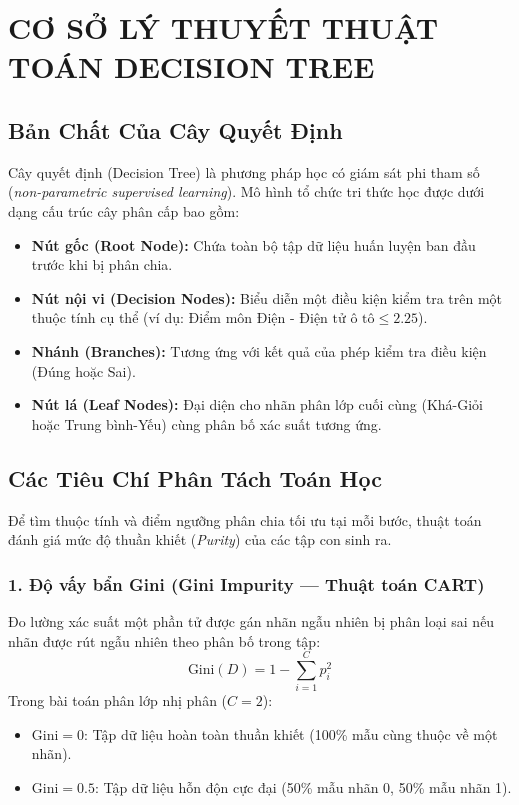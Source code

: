 \documentclass[12pt,a4paper]{article}
\begin{document}
\newpage
\section{CƠ SỞ LÝ THUYẾT THUẬT TOÁN DECISION TREE}

\subsection{Bản Chất Của Cây Quyết Định}
Cây quyết định (Decision Tree) là phương pháp học có giám sát phi tham số (\textit{non-parametric supervised learning}). Mô hình tổ chức tri thức học được dưới dạng cấu trúc cây phân cấp bao gồm:
\begin{itemize}
    \item \textbf{Nút gốc (Root Node):} Chứa toàn bộ tập dữ liệu huấn luyện ban đầu trước khi bị phân chia.
    \item \textbf{Nút nội vi (Decision Nodes):} Biểu diễn một điều kiện kiểm tra trên một thuộc tính cụ thể (ví dụ: $\text{Điểm môn Điện - Điện tử ô tô} \le 2.25$).
    \item \textbf{Nhánh (Branches):} Tương ứng với kết quả của phép kiểm tra điều kiện (Đúng hoặc Sai).
    \item \textbf{Nút lá (Leaf Nodes):} Đại diện cho nhãn phân lớp cuối cùng (Khá-Giỏi hoặc Trung bình-Yếu) cùng phân bố xác suất tương ứng.
\end{itemize}

\subsection{Các Tiêu Chí Phân Tách Toán Học}
Để tìm thuộc tính và điểm ngưỡng phân chia tối ưu tại mỗi bước, thuật toán đánh giá mức độ thuần khiết (\textit{Purity}) của các tập con sinh ra.

\subsubsection{1. Độ vấy bẩn Gini (Gini Impurity --- Thuật toán CART)}
Đo lường xác suất một phần tử được gán nhãn ngẫu nhiên bị phân loại sai nếu nhãn được rút ngẫu nhiên theo phân bố trong tập:
\begin{equation}
    \text{Gini}(D) = 1 - \sum_{i=1}^{C} p_i^2
\end{equation}
Trong bài toán phân lớp nhị phân ($C = 2$):
\begin{itemize}
    \item $\text{Gini} = 0$: Tập dữ liệu hoàn toàn thuần khiết (100\% mẫu cùng thuộc về một nhãn).
    \item $\text{Gini} = 0.5$: Tập dữ liệu hỗn độn cực đại (50\% mẫu nhãn 0, 50\% mẫu nhãn 1).
\end{itemize}
\end{document}
